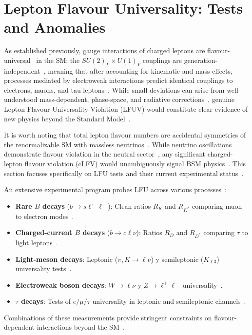 \section{Lepton Flavour Universality: Tests and Anomalies}\label{sec:LFU}

As established previously, gauge interactions of charged leptons are flavour-universal~\cite{gl1961579,PhysRevLett.19.1264,1674-1137-40-10-100001} in the SM: the $SU(2)_L\times U(1)_Y$ couplings are generation-independent~\cite{gl1961579,PhysRevLett.19.1264}, meaning that after accounting for kinematic and mass effects, processes mediated by electroweak interactions predict identical couplings to electrons, muons, and tau leptons~\cite{1674-1137-40-10-100001}. While small deviations can arise from well-understood mass-dependent, phase-space, and radiative corrections~\cite{1674-1137-40-10-100001}, genuine Lepton Flavour Universality Violation (LFUV) would constitute clear evidence of new physics beyond the Standard Model~\cite{Hiller:2014yaa,Dorsner:2016wpm,Buttazzo:2017ixm}.

It is worth noting that total lepton flavour numbers are accidental symmetries of the renormalizable SM with massless neutrinos~\cite{1674-1137-40-10-100001}. While neutrino oscillations demonstrate flavour violation in the neutral sector~\cite{SuperK:1998osc,SNO:2002NC}, any significant charged-lepton flavour violation (cLFV) would unambiguously signal BSM physics~\parencite{1674-1137-40-10-100001}. This section focuses specifically on LFU tests and their current experimental status~\cite{1674-1137-40-10-100001,Ciuchini:2022wbq}.

An extensive experimental program probes LFU across various processes~\cite{1674-1137-40-10-100001}:
\begin{itemize}
  \item \textbf{Rare $B$ decays} ($b\to s\ell^+\ell^-$): Clean ratios $R_K$ and $R_{K^*}$ comparing muon to electron modes~\cite{LHCb:2014vgu,LHCb:2017avl,LHCb:2019hip,LHCb:2021trn,LHCb:2022qnv,LHCb:2022zom,Hiller:2014yaa}.
  \item \textbf{Charged-current $B$ decays} ($b\to c\ell\nu$): Ratios $R_D$ and $R_{D^*}$ comparing $\tau$ to light leptons~\cite{BaBar:2012obs,BaBar:2013mob,Belle:2015qfa,LHCb:2015gmp,LHCb:2017rln,LHCb:2023zxo,Amhis_2021}.
  \item \textbf{Light-meson decays}: Leptonic ($\pi, K\to \ell\nu$) y semileptonic ($K_{\ell3}$) universality tests~\cite{1674-1137-40-10-100001,Antonelli:2010}.
  \item \textbf{Electroweak boson decays}: $W\to \ell\nu$ y $Z\to \ell^+\ell^-$ universality~\cite{atlas2020test,LEPEW:2006}.
  \item \textbf{$\tau$ decays}: Tests of $e/\mu/\tau$ universality in leptonic and semileptonic channels~\cite{1674-1137-40-10-100001,Amhis_2021}.
\end{itemize}
Combinations of these measurements provide stringent constraints on flavour-dependent interactions beyond the SM~\parencite{1674-1137-40-10-100001}.

